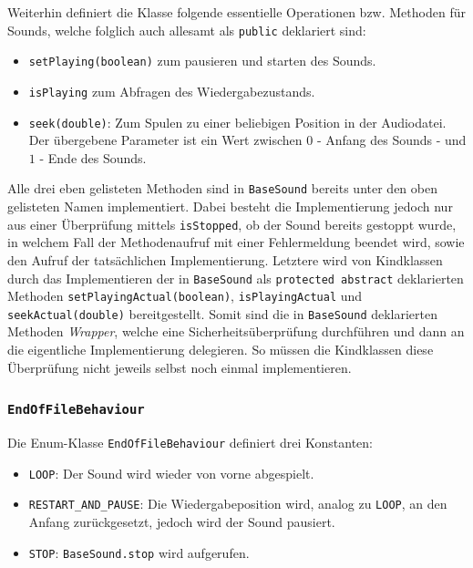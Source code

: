 \begin{sloppypar}
Weiterhin definiert die Klasse folgende essentielle Operationen bzw. Methoden für Sounds,
welche folglich auch allesamt als \texttt{public} deklariert sind:

\begin{itemize}
	\item \texttt{setPlaying(boolean)} zum pausieren und starten des Sounds.
	\item \texttt{isPlaying} zum Abfragen des Wiedergabezustands.
	\item \texttt{seek(double)}: Zum Spulen zu einer beliebigen Position
	      in der Audiodatei. Der übergebene Parameter ist ein Wert zwischen
	      $0$ - Anfang des Sounds - und $1$ - Ende des Sounds.
\end{itemize}

Alle drei eben gelisteten Methoden sind in \texttt{BaseSound} bereits unter
den oben gelisteten Namen implementiert. Dabei besteht die Implementierung
jedoch nur aus einer Überprüfung mittels \texttt{isStopped}, ob der Sound
bereits gestoppt wurde, in welchem Fall der Methodenaufruf mit einer Fehlermeldung
beendet wird, sowie den Aufruf der tatsächlichen Implementierung.
Letztere wird von Kindklassen durch das Implementieren der in \texttt{BaseSound}
als \texttt{protected abstract} deklarierten Methoden \texttt{setPlayingActual(boolean)},
\texttt{isPlayingActual} und \texttt{seekActual(double)} bereitgestellt.
Somit sind die in \texttt{BaseSound} deklarierten Methoden \textit{Wrapper},
welche eine Sicherheitsüberprüfung durchführen und dann an die eigentliche
Implementierung delegieren. So müssen die Kindklassen diese Überprüfung
nicht jeweils selbst noch einmal implementieren.


\subsubsection{\texttt{EndOfFileBehaviour}}

Die Enum-Klasse \texttt{EndOfFileBehaviour} definiert drei Konstanten:

\begin{itemize}
	\item \texttt{LOOP}: Der Sound wird wieder von vorne abgespielt.
	\item \texttt{RESTART\_AND\_PAUSE}: Die Wiedergabeposition wird,
	      analog zu \texttt{LOOP}, an den Anfang zurückgesetzt, jedoch
	      wird der Sound pausiert.
	\item \texttt{STOP}: \texttt{BaseSound.stop} wird aufgerufen.
\end{itemize}


\end{sloppypar}
